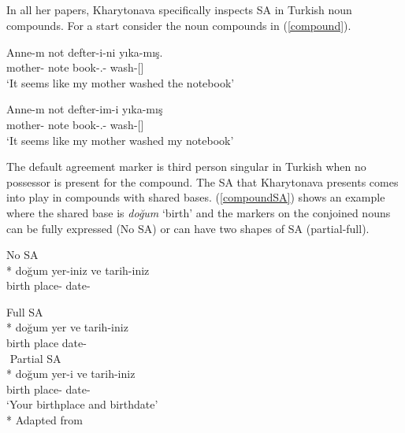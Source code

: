\subsection{\cite{kharytonava2011morphology, kharytonava2012word,kharytonava2012taming}}

In all her papers, Kharytonava specifically inspects SA in Turkish noun compounds. For a start consider the noun compounds in (\ref{compound}).

\begin{exe}
    \ex \label{compound}
    \begin{xlist}
        \ex \gll Anne-m not defter-i-ni yıka-mış. \\
        mother-{\Fsg} note book-{\Poss}.{\Tsg}-{\Acc} wash-{\Prf}[{\Tsg}] \\
        \glt `It seems like my mother washed the notebook'
        
        \ex \gll Anne-m not defter-im-i yıka-mış \\
        mother-{\Fsg} note book-{\Poss}.{\Fsg}-{\Acc} wash-{\Prf}[{\Tsg}] \\
        \glt `It seems like my mother washed my notebook'
    \end{xlist}
\end{exe}

The default agreement marker is third person singular in Turkish when no possessor is present for the compound. The SA that Kharytonava presents comes into play in compounds with shared bases. (\ref{compoundSA}) shows an example where the shared base is \textit{doğum} `birth' and the markers on the conjoined nouns can be fully expressed (No SA) or can have two shapes of SA (partial-full).

\begin{exe}
    \ex \label{compoundSA}
    \begin{xlist}
        \ex No SA\\*
        \gll doğum yer-iniz ve tarih-iniz \\ 
        birth place-{\Spl} {\And} date-{\Spl} \\
        \glt ${}$
        
        \ex \label{compoundSAb} Full SA\\*
        \gll doğum yer ve tarih-iniz \\ 
        birth place {\And} date-{\Spl} \\
        \glt ${}$
        \ex \label{compoundSAc} Partial SA\\*
        \gll doğum yer-i ve tarih-iniz \\ 
        birth place-{\Tsg} {\And} date-{\Spl} \\
        \glt `Your birthplace and birthdate'\\*
        \hfill Adapted from \cite{kharytonava2012taming}
    \end{xlist}
\end{exe}

